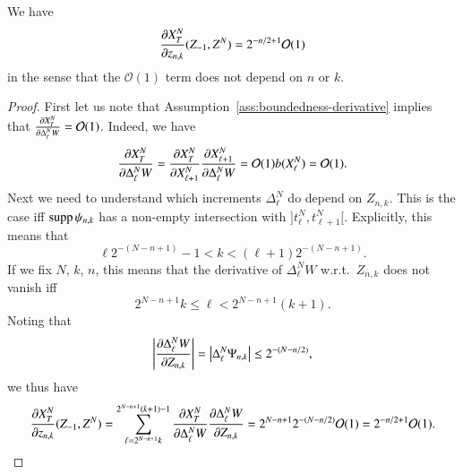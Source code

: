\documentclass{amsart}
\begin{document}
\begin{lemma}
  \label{lem:dXdZ}
  We have
  \begin{equation*}
    \frac{\partial X^N_T}{\partial z_{n,k}}(Z_{-1}, Z^N) = 2^{-n/2+1} \mathcal{O}(1)
  \end{equation*}
  in the sense that the $\mathcal{O}(1)$ term does not depend on $n$ or $k$.
\end{lemma}
\begin{proof}
  First let us note that Assumption~\ref{ass:boundedness-derivative} implies
  that $\frac{\partial X^N_T}{\partial \Delta^N_\ell W} = \mathcal{O}(1)$. Indeed, we have
  \begin{equation*}
    \frac{\partial X^N_T}{\partial \Delta^N_\ell W} = \frac{\partial X^N_T}{\partial X^N_{\ell+1}}
    \frac{\partial X^N_{\ell+1}}{\partial \Delta^N_\ell W} = \mathcal{O}(1) b(X^N_\ell) =
    \mathcal{O}(1).
  \end{equation*}
  Next we need to understand which increments $\Delta^N_\ell$ do depend on
  $Z_{n,k}$. This is the case iff $\operatorname{supp} \psi_{n,k}$ has a non-empty
  intersection with $]t^N_{\ell}, t^N_{\ell+1}[$. Explicitly, this means that
  \begin{equation*}
    \ell 2^{-(N-n+1)} -1 < k < (\ell+1) 2^{-(N-n+1)}.
  \end{equation*}
  If we fix $N$, $k$, $n$, this means that the derivative of $\Delta^N_\ell W$
  w.r.t.~$Z_{n,k}$ does not vanish iff
  \begin{equation*}
    2^{N-n+1} k \le \ell < 2^{N-n+1} (k+1).
  \end{equation*}
  Noting that
  \begin{equation}\label{eq:dWdZ}
    \left\lvert\frac{\partial \Delta^N_\ell W}{\partial Z_{n,k}}\right\rvert = \left\lvert\Delta^N_\ell \Psi_{n,k}\right\rvert
    \le 2^{-(N-n/2)},
  \end{equation}
  we thus have
  \begin{equation}
    \label{eq:2}
    \frac{\partial X^N_T}{\partial z_{n,k}}(Z_{-1}, Z^N) =
    \sum_{\ell=2^{N-n+1}k}^{2^{N-n+1}(k+1)-1} \frac{\partial X^N_T}{\partial \Delta^N_\ell
      W} \frac{\partial \Delta^N_\ell W}{\partial Z_{n,k}} = 2^{N-n+1} 2^{-(N-n/2)}
    \mathcal{O}(1) = 2^{-n/2+1} \mathcal{O}(1).\qedhere
  \end{equation}
\end{proof}
\end{document}

